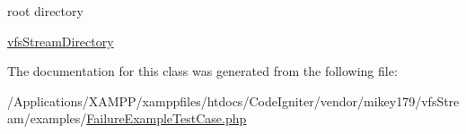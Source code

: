 root directory

\mbox{\hyperlink{classorg_1_1bovigo_1_1vfs_1_1vfs_stream_directory}{vfs\+Stream\+Directory}} 

The documentation for this class was generated from the following file\+:\begin{DoxyCompactItemize}
\item 
/\+Applications/\+X\+A\+M\+P\+P/xamppfiles/htdocs/\+Code\+Igniter/vendor/mikey179/vfs\+Stream/examples/\mbox{\hyperlink{_failure_example_test_case_8php}{Failure\+Example\+Test\+Case.\+php}}\end{DoxyCompactItemize}
